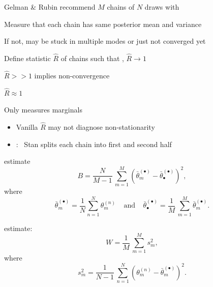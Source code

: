 \documentclass[10pt]{report}
\begin{document}
%
\begin{subitemize}
\item Gelman \& Rubin recommend $M$ chains of $N$ draws with
\item Measure that each chain has same posterior mean and variance
\item If not, may be stuck in multiple modes or just not converged yet
\item Define statistic $\hat{R}$ of chains such that ,
$\hat{R} \rightarrow 1$
\begin{subsubitemize}
\item $\hat{R} >\!> 1$ implies non-convergence
\item $\hat{R} \approx 1$ 
\item Only measures marginals
\end{subsubitemize}
\end{subitemize}


\begin{itemize}
\item Vanilla $\hat{R}$ may not diagnose non-stationarity
\item {}: \ Stan splits each chain into first and
  second half
\end{itemize}


%
\begin{subitemize}
\item {} estimate
\[\textstyle
B
= \frac{N}{M-1} \, \sum_{m=1}^M (\bar{\theta}^{(\bullet)}_{m} - \bar{\theta}^{(\bullet)}_{\bullet})^2,
\]
%
where
%
\[\textstyle
\bar{\theta}_m^{(\bullet)}
= \frac{1}{N} \sum_{n = 1}^N \theta_m^{(n)}
\ \ \ \ \
\mbox{and}
\ \ \ \ \
\bar{\theta}^{(\bullet)}_{\bullet}
= \frac{1}{M} \, \sum_{m=1}^M \bar{\theta}_m^{(\bullet)}.
\]
\vspace*{6pt}
\item {} estimate:
\[\textstyle
W
= \frac{1}{M} \, \sum_{m=1}^M s_m^2,
\]
where
\[\textstyle
s_m^2 = \frac{1}{N-1} \, \sum_{n=1}^N (\theta^{(n)}_m - \bar{\theta}^{(\bullet)}_m)^2.
\]
\end{subitemize}
\end{document}
